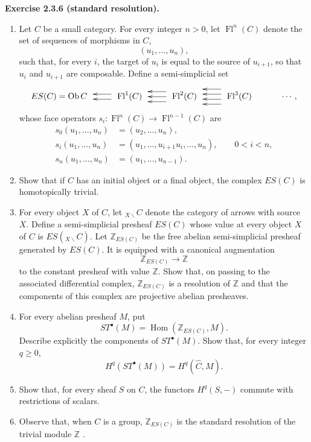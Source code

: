 \documentclass[11pt]{article}
\newcommand{\ZZ}{\mathbb Z}
\newcommand{\Hom}{\operatorname{Hom}}
\newcommand{\ob}{\operatorname{Ob}}
\newcommand{\Fl}{\operatorname{Fl}}
\newenvironment{remarktext}[1]{\par\medskip\noindent\textbf{#1.}\ }{\par\medskip}
\begin{document}
\begin{remarktext}{Exercise 2.3.6 (standard resolution)}
\begin{enumerate}[label=\alph*)]
\item Let $C$ be a small category. For every integer $n>0$, let $\Fl^n(C)$ denote the set of sequences of morphisms in $C$,
\[
(u_1,\ldots,u_n),
\]
such that, for every $i$, the target of $u_i$ is equal to the source of $u_{i+1}$, so that $u_i$ and $u_{i+1}$ are composable. Define a semi-simplicial set
\[
\xymatrix@M=.25cm@C=.75cm{
ES(C)=\ob C &
\Fl^1(C)\ar@<3pt>[l]\ar@<-3pt>[l]&
\Fl^2(C)\ar@<6pt>[l]\ar[l]\ar@<-6pt>[l]&
\Fl^3(C)\ar@<9pt>[l]\ar@<3pt>[l]\ar@<-3pt>[l]\ar@<-9pt>[l]&
\cdots ,
}
\]
whose face operators $s_i:\Fl^n(C)\to \Fl^{n-1}(C)$ are
\begin{align*}
s_0(u_1,\ldots,u_n)&=(u_2,\ldots,u_n),\\
s_i(u_1,\ldots,u_n)&=(u_1,\ldots,u_{i+1}u_i,\ldots,u_n),
\qquad 0<i<n,\\
s_n(u_1,\ldots,u_n)&=(u_1,\ldots,u_{n-1}).
\end{align*}

\item Show that if $C$ has an initial object or a final object, the complex $ES(C)$ is homotopically trivial.

\item For every object $X$ of $C$, let ${}_{X\backslash}C$ denote the category of arrows with source $X$. Define a semi-simplicial presheaf $ES(C)$ whose value at every object $X$ of $C$ is $ES({}_{X\backslash}C)$. Let $\ZZ_{ES(C)}$ be the free abelian semi-simplicial presheaf generated by $ES(C)$. It is equipped with a canonical augmentation
\[
\ZZ_{ES(C)}\longrightarrow \ZZ
\]
to the constant presheaf with value $\ZZ$. Show that, on passing to the associated differential complex, $\ZZ_{ES(C)}$ is a resolution of $\ZZ$ and that the components of this complex are projective abelian presheaves.

\item For every abelian presheaf $M$, put
\[
ST^\bullet(M)=\Hom(\ZZ_{ES(C)},M).
\]
Describe explicitly the components of $ST^\bullet(M)$. Show that, for every integer $q\geq0$,
\[
H^q(ST^\bullet(M))=H^q(\widehat C,M).
\]

\item Show that, for every sheaf $S$ on $C$, the functors $H^q(S,-)$ commute with restrictions of scalars.

\item Observe that, when $C$ is a group, $\ZZ_{ES(C)}$ is the standard resolution of the trivial module $\ZZ$ \cite{3}.


\end{enumerate}
\end{remarktext}
\end{document}
